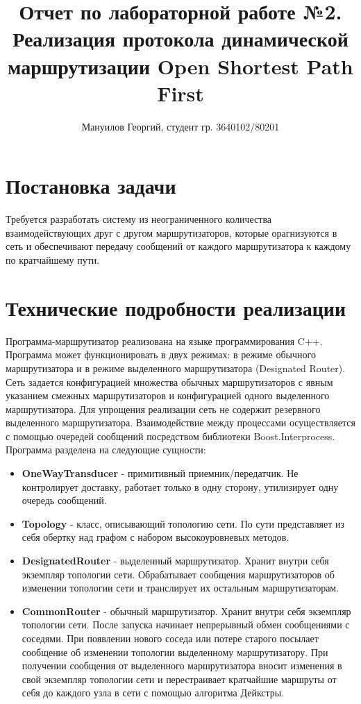\documentclass{report}
\title{
Отчет по лабораторной работе №2.\\
Реализация протокола динамической маршрутизации Open Shortest Path First
}
\author{Мануилов Георгий, студент гр. 3640102/80201}
\date{}
\begin{document}
\maketitle

\renewcommand\thesection{\arabic{section}}

\section{Постановка задачи}
Требуется разработать систему из неограниченного количества взаимодействующих друг с другом маршрутизаторов, которые орагнизуются в сеть и обеспечивают передачу сообщений от каждого маршрутизатора к каждому по кратчайшему пути.

\section{Технические подробности реализации}
Программа-маршрутизатор реализована на языке программирования C++. Программа может функционировать в двух режимах: в режиме обычного маршрутизатора и в режиме выделенного маршрутизатора (Designated Router). Сеть задается конфигурацией множества обычных маршрутизаторов с явным указанием смежных маршрутизаторов и конфигурацией одного выделенного маршрутизатора. Для упрощения реализации сеть не содержит резервного выделенного маршрутизатора. Взаимодействие между процессами осуществляется с помощью очередей сообщений посредством библиотеки Boost.Interprocess.
\newline
\newline
Программа разделена на следующие сущности:
\begin{itemize}
    \item {\bf OneWayTransducer} - примитивный приемник/передатчик. Не контролирует доставку, работает только в одну сторону, утилизирует одну очередь сообщений.
    \item {\bf Topology} - класс, описывающий топологию сети. По сути представляет из себя обертку над графом с набором высокоуровневых методов.
    \item {\bf DesignatedRouter} - выделенный маршрутизатор. Хранит внутри себя экземпляр топологии сети. Обрабатывает сообщения маршрутизаторов об изменении топологии сети и транслирует их остальным маршрутизаторам.
    \item {\bf CommonRouter} - обычный маршрутизатор. Хранит внутри себя экземпляр топологии сети. После запуска начинает непрерывный обмен сообщениями с соседями. При появлении нового соседа или потере старого посылает сообщение об изменении топологии выделенному маршрутизатору. При получении сообщения от выделенного маршрутизатора вносит изменения в свой экземпляр топологии сети и перестраивает кратчайшие маршруты от себя до каждого узла в сети с помощью алгоритма Дейкстры.
\end{itemize}
\end{document}
